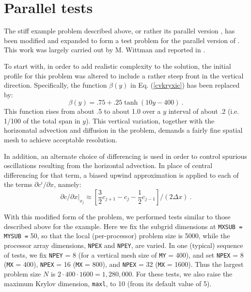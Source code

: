 \section{Parallel tests}\label{s:ex_tests}

The stiff example problem  described above, or rather its parallel
version , has been modified and expanded to form a test problem for
the parallel version of {\cvode}.  This work was largely carried out
by M. Wittman and reported in \cite{Wit:96}.

To start with, in order to add realistic complexity to the solution, the
initial profile for this problem was altered to include a rather steep front
in the vertical direction. Specifically, the function $\beta(y)$ in
Eq. (\ref{cvkryxic}) has been replaced by: 
\begin{equation}
\beta(y) = .75 + .25 \tanh(10 y - 400) ~.
\end{equation}
This function rises from about .5 to about 1.0 over a $y$ interval of about
.2 (i.e. 1/100 of the total span in $y$). This vertical variation, together
with the horizonatal advection and diffusion in the problem, demands a
fairly fine spatial mesh to achieve acceptable resolution.

In addition, an alternate choice of differencing is used in order to control
spurious oscillations resulting from the horizontal advection. In place of
central differencing for that term, a biased upwind approximation is applied
to each of the terms $\partial c^i/\partial x$, namely: 
\begin{equation}
\left. \partial c/\partial x\right| _{x_j}\approx \left[ \frac
32c_{j+1}-c_j-\frac 12c_{j-1}\right] /(2\Delta x) ~.
\end{equation}

With this modified form of the problem, we performed tests similar to those
described above for the example. Here we fix the subgrid dimensions at
{\tt MXSUB = MYSUB =} 50, so that the local (per-processor) problem size is 5000,
while the processor array dimensions, {\tt NPEX} and {\tt NPEY}, are varied.
In one (typical) sequence of tests, we fix {\tt NPEY} = 8 (for a vertical
mesh size of {\tt MY} = 400), and set {\tt NPEX} = 8 ({\tt MX} = 400),
{\tt NPEX} = 16 ({\tt MX} = 800), and {\tt NPEX} = 32 ({\tt MX} = 1600). 
Thus the largest problem size $N$ is $2 \cdot 400 \cdot 1600 = 1,280,000$. 
For these tests, we also raise the maximum Krylov dimension, {\tt maxl},
to 10 (from its default value of 5).

